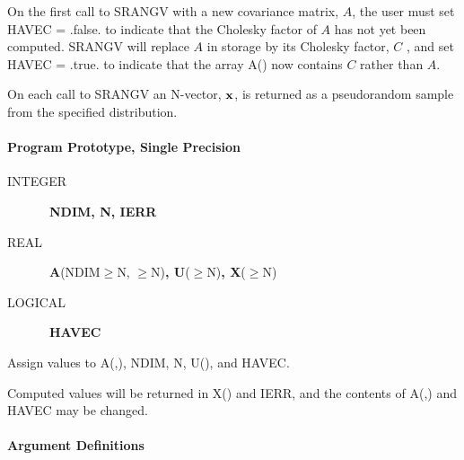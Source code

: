 \documentclass[twoside]{MATH77}
\begin{document}
On the first call to SRANGV with a new covariance matrix, $A$, the user must
set HAVEC = .false. to indicate that the Cholesky factor of $A$ has not yet
been computed. SRANGV will replace $A$ in storage by its Cholesky factor, $C$%
, and set HAVEC = .true. to indicate that the array A() now contains $C$
rather than $A$.

On each call to SRANGV an N-vector, ${\bf x}$, is returned as a pseudorandom
sample from the specified distribution.

\paragraph{Program Prototype, Single Precision}

\begin{description}
\item[INTEGER]  \ {\bf NDIM, N, IERR}

\item[REAL]  \ {\bf A}(NDIM$\geq $N, $\geq $N){\bf , U}($\geq $N){\bf , X}($%
\geq $N)

\item[LOGICAL]  \ {\bf HAVEC}
\end{description}

Assign values to A(,), NDIM, N, U(), and HAVEC.

\begin{center}
\end{center}

Computed values will be returned in X() and IERR, and the contents of A(,)
and HAVEC may be changed.

\paragraph{Argument Definitions}
\end{document}
